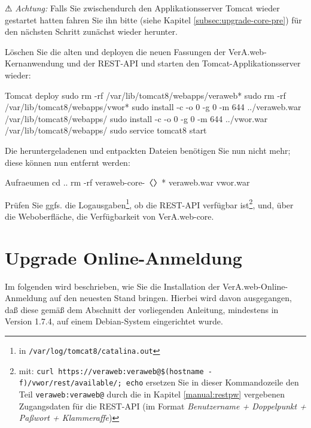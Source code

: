 \documentclass{tarentanleitung}
\newcommand{\vwiaverssw}{1.9.5}
\begin{document}
⚠ \emph{Achtung:} Falls Sie zwischendurch den Applikationsserver
Tomcat wieder gestartet hatten fahren Sie ihn bitte (siehe Kapitel
\ref{subsec:upgrade-core-pre}) für den nächsten Schritt zunächst
wieder herunter.

\begin{minipage}{\linewidth}
Löschen Sie die alten und deployen die neuen Fassungen der
VerA.web-Kernanwendung und der REST-API und starten den
Tomcat-Applikationsserver wieder:

\begin{lstdump}{Tomcat deploy}
sudo rm -rf /var/lib/tomcat8/webapps/veraweb*
sudo rm -rf /var/lib/tomcat8/webapps/vwor*
sudo install -c -o 0 -g 0 -m 644 ../veraweb.war /var/lib/tomcat8/webapps/
sudo install -c -o 0 -g 0 -m 644 ../vwor.war /var/lib/tomcat8/webapps/
sudo service tomcat8 start
\end{lstdump}
\end{minipage}

\begin{minipage}{\linewidth}
Die heruntergeladenen und entpackten Dateien benötigen Sie nun nicht
mehr; diese können nun entfernt werden:

\begin{lstdump}{Aufraeumen}
cd ..
rm -rf veraweb-core-〈\lstdumpesc{\vwiaverssw}〉* veraweb.war vwor.war
\end{lstdump}
\end{minipage}

Prüfen Sie ggfs. die Logausgaben\Hair\footnote{\label{fn:tomcatlogs}in
\texttt{/var/log/tomcat8/catalina.out}}, ob die REST-API verfügbar
ist\Hair\footnote{\label{fn:vworcheck}mit:
\texttt{curl https://veraweb:veraweb@\$(hostname -f)/vwor/rest/available/; echo}%
\dash ersetzen Sie in dieser Kommandozeile den Teil \texttt{veraweb:veraweb@}
durch die in Kapitel \ref{manual:restpw} vergebenen Zugangsdaten für die
REST-API (im Format {\itshape Benutzername + Doppelpunkt + Paßwort +
Klammeraffe})}, und, über die Weboberfläche, die Verfügbarkeit von
VerA.web-core.

\section{Upgrade Online-Anmeldung}\label{sec:upgrade-oa}

Im folgenden wird beschrieben, wie Sie die Installation der
VerA.web-Online-Anmeldung auf den neuesten Stand bringen.
Hierbei wird davon ausgegangen, daß diese gemäß dem Abschnitt
 der vorliegenden Anleitung, mindestens
in Version 1.7.4, auf einem Debian-System eingerichtet wurde.
\end{document}
